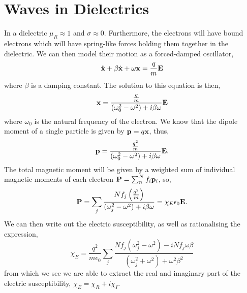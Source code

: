 \documentclass{book}
\begin{document}
\section{Waves in Dielectrics}
In a dielectric $\mu_R \approx 1$ and $\sigma \approx 0$. Furthermore, the electrons will have bound electrons which will have spring-like forces holding them together in the dielectric. We can then model their motion as a forced-damped oscillator,
\begin{equation}
	\Ddot{\vb{x}} + \beta \Dot{\vb{x}} + \omega \vb{x} = \frac{q}{m}\vb{E}
\end{equation}
where $\beta$ is a damping constant. The solution to this equation is then,
\begin{equation}
	\vb{x} = \frac{\frac{q}{m}}{(\omega_0^2 - \omega^2)+i\beta\omega}\vb{E}
\end{equation}
where $\omega_0$ is the natural frequency of the electron. We know that the dipole moment of a single particle is given by $\vb{p} = q\vb{x}$, thus,
\begin{equation}
	\vb{p} = \frac{\frac{q^2}{m}}{(\omega_0^2 -\omega^2) + i \beta \omega}\vb{E}.
\end{equation}
The total magnetic moment will be given by a weighted sum of individual magnetic moments of each electron $\vb{P} = \sum_n^Nf_i\vb{p}_i$, so,
\begin{equation}
	\vb{P} = \sum_j \frac{Nf_j\left(\frac{q^2}{m}\right)}{(\omega_j^2 -\omega^2) +i\beta\omega} = \chi_E \epsilon_0 \vb{E}. 
\end{equation}
We can then write out the electric susceptibility, as well as rationalising the expression,
\begin{equation}
	\chi_E = \frac{q^2}{m\epsilon_0}\sum_j \frac{Nf_j(\omega_j^2 - \omega^2) - iNf_j\omega\beta}{(\omega_j^2 + \omega^2) + \omega^2 \beta^2}
\end{equation}
from which we see we are able to extract the real and imaginary part of the electric susceptibility, $\chi_E = \chi_R + i\chi_I$.
\end{document}
